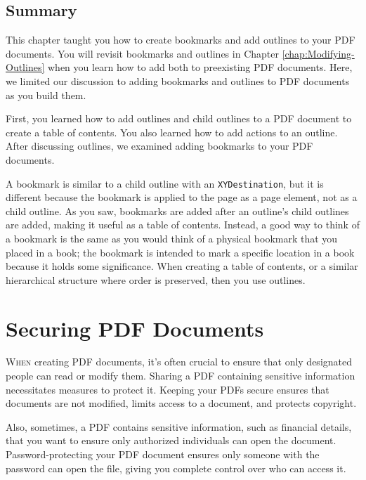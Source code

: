 \documentclass[american]{tufte-book}
\numberwithin{equation}{section}
\numberwithin{figure}{section}
\def\color#1{}%
\begin{document}
{\section{Summary}

This chapter taught you how to create bookmarks and add outlines to
your PDF documents. You will revisit bookmarks and outlines in Chapter \ref{chap:Modifying-Outlines}
when you learn how to add both to preexisting PDF documents. Here, we limited
our discussion to adding bookmarks and outlines to PDF documents as
you build them. 

First, you learned how to add outlines and child outlines
to a PDF document to create a table of contents. You also learned
how to add actions to an outline. After discussing outlines, we examined adding bookmarks to your PDF
documents. 

A bookmark is similar to a child outline with an \texttt{XYDestination},
but it is different because the bookmark is applied to the page as
a page element, not as a child outline. As you saw, bookmarks are
added after an outline's child outlines are added, making it useful
as a table of contents. Instead, a good way to think of a bookmark
is the same as you would think of a physical bookmark that you placed
in a book; the bookmark is intended to mark a specific location in
a book because it holds some significance. When creating a table of
contents, or a similar hierarchical structure where order is preserved,
then you use outlines.

\color{white}
\chapter{Securing PDF Documents}\label{chap:Security,-Signing-and}
\color{black}
\BgThispage
\vspace{8.0em}
\lettrine[lines=2,lhang=0.1]{W}{hen} creating PDF documents, it's often crucial to ensure that only
designated people can read or modify them. Sharing a PDF containing
sensitive information necessitates measures to protect it. Keeping
your PDFs secure ensures that documents are not modified, limits access
to a document, and protects copyright. 

Also, sometimes, a PDF contains sensitive information, such as financial
details, that you want to ensure only authorized individuals can open
the document. Password-protecting your PDF document ensures only someone
with the password can open the file, giving you complete control over
who can access it. 

}
\end{document}
